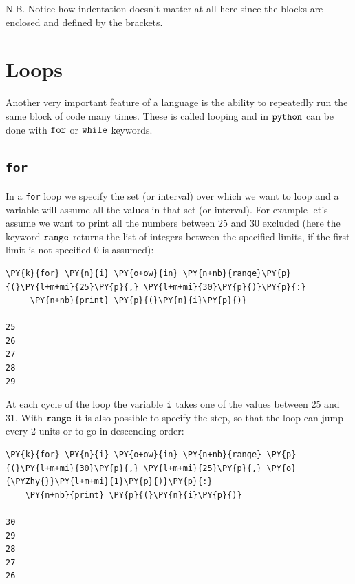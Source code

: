 N.B. Notice how indentation doesn't matter at all here since the blocks are enclosed and defined by the brackets.

\section{Loops}\label{loops}

Another very important feature of a language is the ability to repeatedly run the same block of code many times. These is called looping and in \(\tt{python}\) can be done with $\tt{for}$ or $\tt{while}$ keywords.

\subsection{\texttt{for}}\label{for}

In a \texttt{for} loop we specify the set (or interval) over which we want to loop and a variable will assume all the values in that set (or interval). For example let's assume we want to print all the numbers between 25 and 30 excluded (here the keyword $\tt{range}$ returns the list of integers between the specified limits, if the first limit is not specified 0 is assumed):

\begin{tcolorbox}[breakable, size=fbox, boxrule=1pt, pad at break*=1mm, colback=cellbackground, colframe=cellborder]            
\begin{Verbatim}[commandchars=\\\{\}]
\PY{k}{for} \PY{n}{i} \PY{o+ow}{in} \PY{n+nb}{range}\PY{p}{(}\PY{l+m+mi}{25}\PY{p}{,} \PY{l+m+mi}{30}\PY{p}{)}\PY{p}{:}
     \PY{n+nb}{print} \PY{p}{(}\PY{n}{i}\PY{p}{)}

25
26
27
28
29
\end{Verbatim}
\end{tcolorbox}

At each cycle of the loop the variable $\tt{i}$ takes one of the values between
25 and 31. With $\tt{range}$ it is also possible to specify the step, so that the loop can jump every 2 units or to go in descending order:

\begin{tcolorbox}[breakable, size=fbox, boxrule=1pt, pad at break*=1mm, colback=cellbackground, colframe=cellborder]            
\begin{Verbatim}[commandchars=\\\{\}]
\PY{k}{for} \PY{n}{i} \PY{o+ow}{in} \PY{n+nb}{range} \PY{p}{(}\PY{l+m+mi}{30}\PY{p}{,} \PY{l+m+mi}{25}\PY{p}{,} \PY{o}{\PYZhy{}}\PY{l+m+mi}{1}\PY{p}{)}\PY{p}{:}
    \PY{n+nb}{print} \PY{p}{(}\PY{n}{i}\PY{p}{)}

30
29
28
27
26
\end{Verbatim}
\end{tcolorbox}

